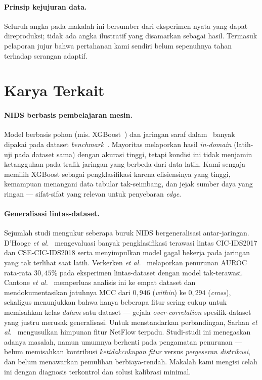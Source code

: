 \documentclass[11pt,a4paper]{article}
\begin{document}
\paragraph{Prinsip kejujuran data.} Seluruh angka pada makalah ini bersumber
dari eksperimen nyata yang dapat direproduksi; tidak ada angka ilustratif yang
disamarkan sebagai hasil.\ifadversarial{} Termasuk pelaporan jujur bahwa pertahanan kami sendiri
belum sepenuhnya tahan terhadap serangan adaptif.\fi

\section{Karya Terkait}
\label{sec:related}

\paragraph{NIDS berbasis pembelajaran mesin.} Model berbasis pohon (mis.
XGBoost~\cite{xgboost,husain,zhou}) dan jaringan saraf
dalam~\cite{shone,liulang,mahdavifar,wu,duan} banyak dipakai pada dataset
\emph{benchmark}~\cite{unsw,cicids}. Mayoritas melaporkan hasil \emph{in-domain}
(latih-uji pada dataset sama) dengan akurasi tinggi, tetapi kondisi ini tidak
menjamin ketangguhan pada trafik jaringan yang berbeda dari data latih. Kami
sengaja memilih XGBoost sebagai pengklasifikasi karena efisiensinya yang tinggi,
kemampuan menangani data tabular tak-seimbang, dan jejak sumber daya yang ringan
--- sifat-sifat yang relevan untuk penyebaran \emph{edge}.

\paragraph{Generalisasi lintas-dataset.} Sejumlah studi mengukur seberapa buruk
NIDS bergeneralisasi antar-jaringan. D'Hooge \emph{et al.}~\cite{dhooge}
mengevaluasi banyak pengklasifikasi terawasi lintas CIC-IDS2017 dan
CSE-CIC-IDS2018 serta menyimpulkan model gagal bekerja pada jaringan yang tak
terlihat saat latih. Verkerken \emph{et al.}~\cite{verkerken} melaporkan
penurunan AUROC rata-rata $30{,}45\%$ pada eksperimen lintas-dataset dengan model
tak-terawasi. Cantone \emph{et al.}~\cite{cantone} memperluas analisis ini ke
empat dataset dan mendokumentasikan jatuhnya MCC dari $0{,}946$ (\emph{within})
ke $0{,}294$ (\emph{cross}), sekaligus menunjukkan bahwa hanya beberapa fitur
sering cukup untuk memisahkan kelas \emph{dalam} satu dataset --- gejala
\emph{over-correlation} spesifik-dataset yang justru merusak generalisasi. Untuk
menstandarkan perbandingan, Sarhan \emph{et al.}~\cite{sarhan,sarhannf} mengusulkan
himpunan fitur NetFlow terpadu. Studi-studi ini menegaskan adanya masalah, namun
umumnya berhenti pada pengamatan penurunan --- belum memisahkan kontribusi
\emph{ketidakcukupan fitur} versus \emph{pergeseran distribusi}, dan belum
menawarkan pemulihan berbiaya-rendah. Makalah kami mengisi celah ini dengan
diagnosis terkontrol dan solusi kalibrasi minimal.
\end{document}
